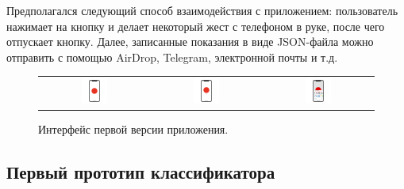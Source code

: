 Предполагался следующий способ взаимодействия с приложением: пользователь нажимает на кнопку и делает некоторый жест с телефоном в руке, после чего отпускает кнопку. Далее, записанные показания в виде JSON-файла можно отправить с помощью AirDrop, Telegram, электронной почты и т.д.
\begin{figure}[H]
    \begin{center}
        \begin{tabular}{ccc}
            \includegraphics[width=0.25\textwidth]{max_kt1_images/image2.png} & 
            \includegraphics[width=0.25\textwidth]{max_kt1_images/image3.png} & 
            \includegraphics[width=0.25\textwidth]{max_kt1_images/image1.png} \\
        \end{tabular}
    \end{center}
    \caption{Интерфейс первой версии приложения.}
\end{figure}


\subsection{Первый прототип классификатора}

